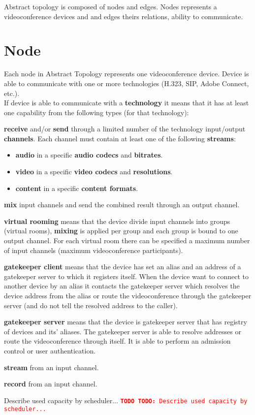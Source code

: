 \documentclass[a4paper]{report}
\newcommand{\TODO}[1]{%
\def\empty{}%
\def\prvniparametr{#1}%
\ifx\prvniparametr\empty%
\begingroup\tt\textcolor{red}{\noindent\textbf{TODO}}\endgroup
\else%
\begingroup\tt\textcolor{red}{\noindent\textbf{TODO:}\ #1}\endgroup
\fi%
}
\begin{document}
Abstract topology is composed of nodes and edges. Nodes represents a videoconference devices and and edges theirs relations, ability to communicate.

\section{Node}

Each node in Abstract Topology represents one videoconference device. Device is able to communicate with one or more technologies (H.323, SIP, Adobe Connect, etc.).
\\
If device is able to communicate with a \textbf{technology} it means that it 
has at least one capability from the following types (for that technology):
\begin{compactitem}
\item \textbf{receive} and/or \textbf{send} through a limited number of 
  the technology input/output \textbf{channels}. Each channel must contain 
  at least one of the following \textbf{streams}:
  \begin{itemize}
    \item \textbf{audio} in a specific \textbf{audio codecs} and 
      \textbf{bitrates}.
    \item \textbf{video} in a specific \textbf{video codecs} and 
      \textbf{resolutions}.
    \item \textbf{content} in a specific \textbf{content formats}.
  \end{itemize} 
\item \textbf{mix} input channels and send the combined result through 
  an output channel.
\item \textbf{virtual rooming} means that the device divide input channels 
  into groups (virtual rooms), \textbf{mixing} is applied per group and
  each group is bound to one output channel. For each virtual room there can 
  be specified a maximum number of input channels (maximum videoconference 
  participants).
\item \textbf{gatekeeper client} means that the device has set an alias 
  and an address of a gatekeeper server to which it registers itself.
  When the device want to connect to another device by an alias it contacts 
  the gatekeeper server which resolves the device address from the alias 
  or route the videoconference through the gatekeeper server (and do not tell
  the resolved address to the caller).
\item \textbf{gatekeeper server} means that the device is gatekeeper server
  that has registry of devices and its' aliases. The gatekeeper server is
  able to resolve addresses or route the videoconference through itself. It is 
  able to perform an admission control or user authentication.
\item \textbf{stream} from an input channel.
\item \textbf{record} from an input channel.
\item \TODO{Describe used capacity by scheduler...}
\end{compactitem}
\end{document}
